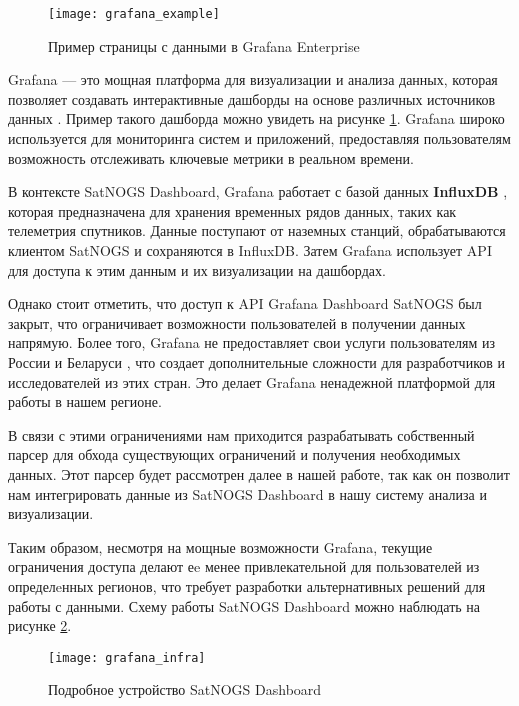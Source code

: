 \documentclass[14pt, a4paper]{src/bsu}
\begin{document}
\begin{figure}[htbp] \centering
	\texttt{[image: grafana\_example]} \caption{Пример
		страницы с данными в Grafana Enterprise} \label{fig:grafana_example}
\end{figure}

Grafana — это мощная платформа для визуализации и анализа данных, которая
позволяет создавать интерактивные дашборды на основе различных источников
данных \cite{grafana_docs}. Пример такого дашборда можно увидеть на рисунке
\ref{fig:grafana_example}. Grafana широко используется для мониторинга систем
и приложений, предоставляя пользователям возможность отслеживать ключевые
метрики в реальном времени.

В контексте SatNOGS Dashboard, Grafana работает с базой данных
\textbf{InfluxDB} \cite{influxdb_docs}, которая предназначена для хранения
временных рядов данных, таких как телеметрия спутников. Данные поступают от
наземных станций, обрабатываются клиентом SatNOGS и сохраняются в InfluxDB.
Затем Grafana использует API для доступа к этим данным и их визуализации на
дашбордах.

Однако стоит отметить, что доступ к API Grafana Dashboard SatNOGS был закрыт,
что ограничивает возможности пользователей в получении данных напрямую. Более
того, Grafana не предоставляет свои услуги пользователям из России и Беларуси
\cite{grafana_community_post}, что создает дополнительные сложности для
разработчиков и исследователей из этих стран. Это делает Grafana ненадежной
платформой для работы в нашем регионе.

В связи с этими ограничениями нам приходится разрабатывать собственный парсер
для обхода существующих ограничений и получения необходимых данных. Этот
парсер будет рассмотрен далее в нашей работе, так как он позволит нам
интегрировать данные из SatNOGS Dashboard в нашу систему анализа и
визуализации.

Таким образом, несмотря на мощные возможности Grafana, текущие ограничения
доступа делают еe менее привлекательной для пользователей из определeнных
регионов, что требует разработки альтернативных решений для работы с данными.
Схему работы SatNOGS Dashboard можно наблюдать на рисунке
\ref{fig:grafana_infra}.

\begin{figure}[htbp] \centering
	\texttt{[image: grafana\_infra]} \caption{Подробное
		устройство SatNOGS Dashboard} \label{fig:grafana_infra} \end{figure}
\end{document}
